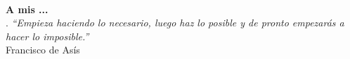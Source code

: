 
\thispagestyle{empty}

\begin{flushright}

  \textbf{} \\
  \vspace{6cm}

  \textbf{A mis ...}\\
  \vspace{3cm}
  \hspace{8cm}.
  \emph{``Empieza haciendo lo necesario, luego haz lo posible y de
    pronto empezarás a hacer lo imposible.''}\\ Francisco de Asís

\end{flushright}  


